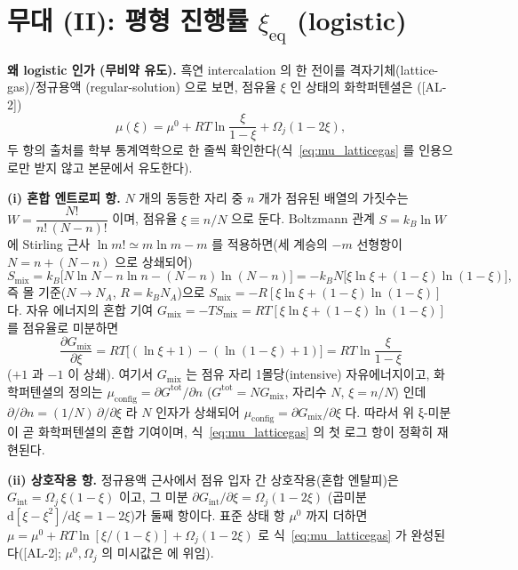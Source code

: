 \documentclass[11pt,a4paper]{article}
\newcommand{\dd}{\mathrm{d}}
\newcommand{\eq}{\mathrm{eq}}
\newcommand{\AL}[1]{\textsf{[AL-#1]}}
\begin{document}
\section{무대 (II): 평형 진행률 $\xi_\eq$ (logistic)}\label{sec:eq}
\textbf{왜 logistic 인가 (무비약 유도).} 흑연 intercalation 의 한 전이를 격자기체(lattice-gas)/정규용액
(regular-solution) 으로 보면, 점유율 $\xi$ 인 상태의 화학퍼텐셜은 \cite{mckinnon1983,bazant2013}(\AL{2})
\begin{equation}
\mu(\xi)=\mu^0+RT\ln\frac{\xi}{1-\xi}+\Omega_j(1-2\xi),
\label{eq:mu_latticegas}
\end{equation}
두 항의 출처를 학부 통계역학으로 한 줄씩 확인한다(식~\eqref{eq:mu_latticegas} 를 인용으로만 받지 않고 본문에서 유도한다).

\textbf{(i) 혼합 엔트로피 항.} $N$ 개의 동등한 자리 중 $n$ 개가 점유된 배열의 가짓수는
$W=\dfrac{N!}{n!\,(N-n)!}$ 이며, 점유율 $\xi\equiv n/N$ 으로 둔다. Boltzmann 관계 $S=k_B\ln W$ 에 Stirling
근사 $\ln m!\simeq m\ln m-m$ 를 적용하면(세 계승의 $-m$ 선형항이 $N=n+(N-n)$ 으로 상쇄되어)
\begin{equation}
S_{\mathrm{mix}}=k_B\big[N\ln N-n\ln n-(N-n)\ln(N-n)\big]
=-k_B N\big[\xi\ln\xi+(1-\xi)\ln(1-\xi)\big],
\label{eq:smix}
\end{equation}
즉 몰 기준($N\!\to\!N_A$, $R=k_B N_A$)으로 $S_{\mathrm{mix}}=-R[\xi\ln\xi+(1-\xi)\ln(1-\xi)]$ 다. 자유
에너지의 혼합 기여 $G_{\mathrm{mix}}=-TS_{\mathrm{mix}}=RT[\xi\ln\xi+(1-\xi)\ln(1-\xi)]$ 를 점유율로 미분하면
\begin{equation}
\frac{\partial G_{\mathrm{mix}}}{\partial\xi}=RT\big[(\ln\xi+1)-(\ln(1-\xi)+1)\big]=RT\ln\frac{\xi}{1-\xi}
\label{eq:mu_mix}
\end{equation}
($+1$ 과 $-1$ 이 상쇄). 여기서 $G_{\mathrm{mix}}$ 는 점유 자리 1몰당(intensive) 자유에너지이고, 화학퍼텐셜의 정의는
$\mu_{\mathrm{config}}=\partial G^{\mathrm{tot}}/\partial n$ ($G^{\mathrm{tot}}=N G_{\mathrm{mix}}$, 자리수 $N$, $\xi=n/N$)
인데 $\partial/\partial n=(1/N)\,\partial/\partial\xi$ 라 $N$ 인자가 상쇄되어 $\mu_{\mathrm{config}}=\partial G_{\mathrm{mix}}/\partial\xi$
다. 따라서 위 ξ-미분이 곧 화학퍼텐셜의 혼합 기여이며, 식~\eqref{eq:mu_latticegas} 의 첫 로그 항이 정확히 재현된다.

\textbf{(ii) 상호작용 항.} 정규용액 근사에서 점유 입자 간 상호작용(혼합 엔탈피)은
$G_{\mathrm{int}}=\Omega_j\,\xi(1-\xi)$ 이고, 그 미분 $\partial G_{\mathrm{int}}/\partial\xi
=\Omega_j(1-2\xi)$ (곱미분 $\dd[\xi-\xi^2]/\dd\xi=1-2\xi$)가 둘째 항이다. 표준 상태 항 $\mu^0$ 까지 더하면
$\mu=\mu^0+RT\ln[\xi/(1-\xi)]+\Omega_j(1-2\xi)$ 로 식~\eqref{eq:mu_latticegas} 가 완성된다(\AL{2};
$\mu^0,\Omega_j$ 의 미시값은 \cite{mckinnon1983,bazant2013} 에 위임).
\end{document}
